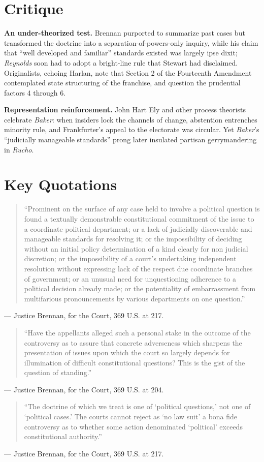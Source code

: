 \documentclass[12pt]{article}
\begin{document}
\section{Critique}

\textbf{An under-theorized test.} Brennan purported to summarize past cases but transformed the doctrine into a separation-of-powers-only inquiry, while his claim that ``well developed and familiar'' standards existed was largely ipse dixit; \textit{Reynolds} soon had to adopt a bright-line rule that Stewart had disclaimed. Originalists, echoing Harlan, note that Section 2 of the Fourteenth Amendment contemplated state structuring of the franchise, and question the prudential factors 4 through 6.

\textbf{Representation reinforcement.} John Hart Ely and other process theorists celebrate \textit{Baker}: when insiders lock the channels of change, abstention entrenches minority rule, and Frankfurter's appeal to the electorate was circular. Yet \textit{Baker}'s ``judicially manageable standards'' prong later insulated partisan gerrymandering in \textit{Rucho}.

\section{Key Quotations}

\begin{quote}
``Prominent on the surface of any case held to involve a political question is found a textually demonstrable constitutional commitment of the issue to a coordinate political department; or a lack of judicially discoverable and manageable standards for resolving it; or the impossibility of deciding without an initial policy determination of a kind clearly for non judicial discretion; or the impossibility of a court's undertaking independent resolution without expressing lack of the respect due coordinate branches of government; or an unusual need for unquestioning adherence to a political decision already made; or the potentiality of embarrassment from multifarious pronouncements by various departments on one question.''
\end{quote}
\noindent --- Justice Brennan, for the Court, 369 U.S. at 217.

\begin{quote}
``Have the appellants alleged such a personal stake in the outcome of the controversy as to assure that concrete adverseness which sharpens the presentation of issues upon which the court so largely depends for illumination of difficult constitutional questions? This is the gist of the question of standing.''
\end{quote}
\noindent --- Justice Brennan, for the Court, 369 U.S. at 204.

\begin{quote}
``The doctrine of which we treat is one of `political questions,' not one of `political cases.' The courts cannot reject as `no law suit' a bona fide controversy as to whether some action denominated `political' exceeds constitutional authority.''
\end{quote}
\noindent --- Justice Brennan, for the Court, 369 U.S. at 217.
\end{document}

